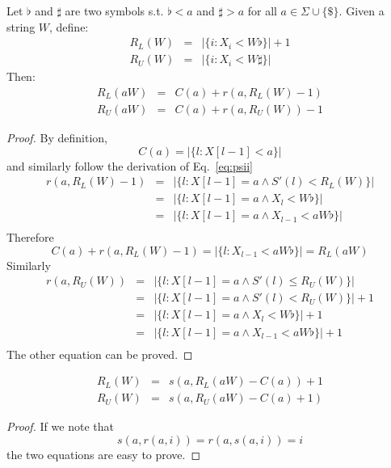 \documentclass{bioinfo}
\begin{document}
\begin{methods}
\begin{lem}
Let $\flat$ and $\sharp$ are two symbols s.t. $\flat<a$ and $\sharp>a$ for all $a\in\Sigma\cup\{\$\}$.
Given a string $W$, define:
\begin{eqnarray*}
R_L(W)&=&\big|\{i:X_i<W\flat\}\big| + 1 \\
R_U(W)&=&\big|\{i:X_i<W\sharp\}\big|
\end{eqnarray*}
Then:
\begin{eqnarray}
R_L(aW)&=&C(a)+r(a,R_L(W)-1)\\
R_U(aW)&=&C(a)+r(a,R_U(W))-1
\end{eqnarray}
\end{lem}
\begin{proof}
By definition,
$$C(a)=\big|\{l:X[l-1]<a\}\big|$$
and similarly follow the derivation of Eq.~\eqref{eq:psii}
\begin{eqnarray*}
r(a,R_L(W)-1)&=&\big|\{l:X[l-1]=a\land S'(l)<R_L(W)\}\big|\\
&=&\big|\{l:X[l-1]=a\land X_l<W\flat\}\big|\\
&=&\big|\{l:X[l-1]=a\land X_{l-1}<aW\flat\}\big|\\
\end{eqnarray*}
Therefore
$$
C(a)+r(a,R_L(W)-1)=\big|\{l:X_{l-1}<aW\flat\}\big|=R_L(aW)
$$
Similarly
\begin{eqnarray*}
r(a,R_U(W))&=&\big|\{l:X[l-1]=a\land S'(l)\le R_U(W)\}\big|\\
&=&\big|\{l:X[l-1]=a\land S'(l)<R_U(W)\}\big|+1\\
&=&\big|\{l:X[l-1]=a\land X_l<W\flat\}\big|+1\\
&=&\big|\{l:X[l-1]=a\land X_{l-1}<aW\flat\}\big|+1\\
\end{eqnarray*}
The other equation can be proved.

\raggedleft{\qedsymbol}
\end{proof}

\begin{proposition}
\begin{eqnarray*}
R_L(W)&=&s(a,R_L(aW)-C(a))+1 \\
R_U(W)&=&s(a,R_U(aW)-C(a)+1)
\end{eqnarray*}
\end{proposition}
\begin{proof}
If we note that
$$
s(a,r(a,i))=r(a,s(a,i))=i
$$
the two equations are easy to prove.

\raggedleft{\qedsymbol}
\end{proof}


\end{methods}
\end{document}

